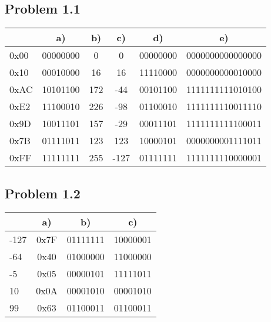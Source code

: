 \documentclass[10pt,a4paper]{article}
\begin{document}
\subsection*{Problem 1.1}
\begin{tabular}{l|c|c|c|c|c}
     & a)       & b)  & c)   & d)       & e)               \\ \hline
0x00 & 00000000 &   0 &    0 & 00000000 & 0000000000000000 \\ \hline
0x10 & 00010000 &  16 &   16 & 11110000 & 0000000000010000 \\ \hline
0xAC & 10101100 & 172 &  -44 & 00101100 & 1111111111010100 \\ \hline
0xE2 & 11100010 & 226 &  -98 & 01100010 & 1111111110011110 \\ \hline
0x9D & 10011101 & 157 &  -29 & 00011101 & 1111111111100011 \\ \hline
0x7B & 01111011 & 123 &  123 & 10000101 & 0000000001111011 \\ \hline
0xFF & 11111111 & 255 & -127 & 01111111 & 1111111110000001
\end{tabular}

\subsection*{Problem 1.2}
\begin{tabular}{l|c|c|c}
     & a)   & b)       & c)       \\ \hline
-127 & 0x7F & 01111111 & 10000001 \\ \hline
 -64 & 0x40 & 01000000 & 11000000 \\ \hline
  -5 & 0x05 & 00000101 & 11111011 \\ \hline 
  10 & 0x0A & 00001010 & 00001010 \\ \hline
  99 & 0x63 & 01100011 & 01100011
\end{tabular}
\end{document}
